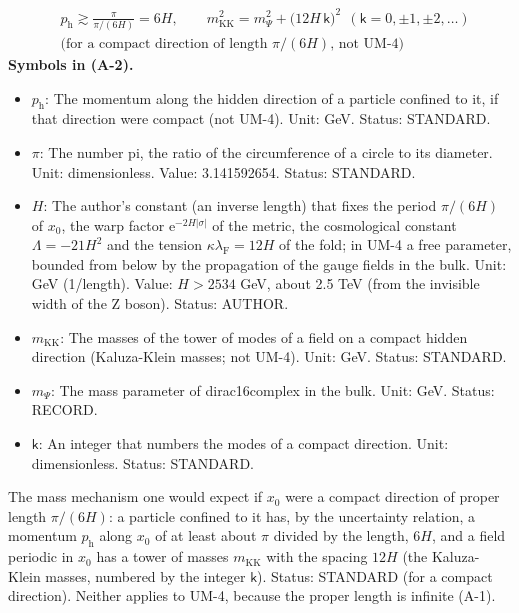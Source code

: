 \documentclass[
  10pt,
]{article}
\providecommand{\tightlist}{%
  \setlength{\itemsep}{0pt}\setlength{\parskip}{0pt}}
\begin{document}
\[
\begin{aligned}
&p_{\mathrm{h}} \gtrsim \frac{\pi}{\pi/(6H)} = 6H,\qquad m_{\mathrm{KK}}^2 = m_\Psi^2 + \big(12H\,\mathsf{k}\big)^2\ \ (\mathsf{k} = 0, \pm1, \pm2, \dots)\\
&\text{(for a compact direction of length } \pi/(6H)\text{, not UM-4)}
\end{aligned} \tag{A-2}
\] \textbf{Symbols in (A-2).}

\begin{itemize}
\tightlist
\item
  \(p_{\mathrm{h}}\): The momentum along the hidden direction of a
  particle confined to it, if that direction were compact (not UM-4).
  Unit: GeV. Status: STANDARD.
\item
  \(\pi\): The number pi, the ratio of the circumference of a circle to
  its diameter. Unit: dimensionless. Value: 3.141592654. Status:
  STANDARD.
\item
  \(H\): The author's constant (an inverse length) that fixes the period
  \(\pi/(6H)\) of \(x_0\), the warp factor
  \(\mathrm{e}^{-2H\lvert\sigma\rvert}\) of the metric, the cosmological
  constant \(\Lambda = -21H^2\) and the tension
  \(\kappa\lambda_{\mathrm{F}} = 12H\) of the fold; in UM-4 a free
  parameter, bounded from below by the propagation of the gauge fields
  in the bulk. Unit: GeV (1/length). Value: \(H > 2534\) GeV, about 2.5
  TeV (from the invisible width of the Z boson). Status: AUTHOR.
\item
  \(m_{\mathrm{KK}}\): The masses of the tower of modes of a field on a
  compact hidden direction (Kaluza-Klein masses; not UM-4). Unit: GeV.
  Status: STANDARD.
\item
  \(m_\Psi\): The mass parameter of dirac16complex in the bulk. Unit:
  GeV. Status: RECORD.
\item
  \(\mathsf{k}\): An integer that numbers the modes of a compact
  direction. Unit: dimensionless. Status: STANDARD.
\end{itemize}

The mass mechanism one would expect if \(x_0\) were a compact direction
of proper length \(\pi/(6H)\): a particle confined to it has, by the
uncertainty relation, a momentum \(p_{\mathrm{h}}\) along \(x_0\) of at
least about \(\pi\) divided by the length, \(6H\), and a field periodic
in \(x_0\) has a tower of masses \(m_{\mathrm{KK}}\) with the spacing
\(12H\) (the Kaluza-Klein masses, numbered by the integer
\(\mathsf{k}\)). Status: STANDARD (for a compact direction). Neither
applies to UM-4, because the proper length is infinite (A-1).
\end{document}
